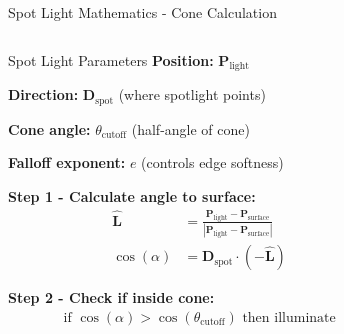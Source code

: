 \begin{frame}{Spot Light Mathematics - Cone Calculation}
  \begin{columns}
    \begin{column}{0.7\textwidth}
      \begin{mathbox}{Spot Light Parameters}
        \textbf{Position:} $\mathbf{P}_{\text{light}}$

        \textbf{Direction:} $\mathbf{D}_{\text{spot}}$ (where spotlight points)

        \textbf{Cone angle:} $\theta_{\text{cutoff}}$ (half-angle of cone)

        \textbf{Falloff exponent:} $e$ (controls edge softness)

        \vspace{0.3cm}
        \pause
        \textbf{Step 1 - Calculate angle to surface:}
        \begin{align*}
          \hat{\mathbf{L}} &= \frac{\mathbf{P}_{\text{light}} - \mathbf{P}_{\text{surface}}}
          {|\mathbf{P}_{\text{light}} - \mathbf{P}_{\text{surface}}|} \\
          \cos(\alpha) &=  \mathbf{D}_{\text{spot}} \cdot (- \hat{\mathbf{L}})
        \end{align*}

        \pause
        \textbf{Step 2 - Check if inside cone:}
        \begin{align}
          \text{if } \cos(\alpha) > \cos(\theta_{\text{cutoff}}) \text{ then illuminate}
        \end{align}
      \end{mathbox}
    \end{column}
    \begin{column}{0.3\textwidth}
    \end{column}
  \end{columns}
\end{frame}

